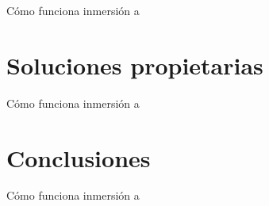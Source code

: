 \documentclass[aspectratio=169, compress]{beamer}
\begin{document}
\begin{frame}{Cómo funciona inmersión}
    a
\end{frame}

\section{Soluciones propietarias}

\begin{frame}{Cómo funciona inmersión}
    a
\end{frame}

\section{Conclusiones}

\begin{frame}{Cómo funciona inmersión}
    a
\end{frame}
\end{document}
